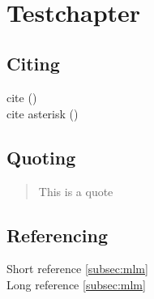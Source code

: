 \documentclass[english]{ttlab-qualify}
\begin{document}
    \
    \chapter{\latex Testchapter}
    \section{Citing}
    cite (\cite{METZLER2016})\\
    cite asterisk (\cite*{METZLER2016})\\

    \section{Quoting}
    \begin{quote}
        This is a quote
    \end{quote}

    \section{Referencing}
    Short reference \ref{subsec:mlm}\\
    Long reference \autoref{subsec:mlm}\\

    \appendix
    \printbibliography
\end{document}

